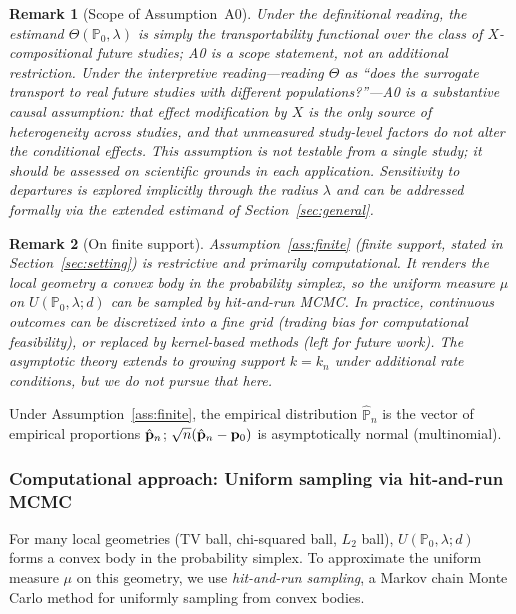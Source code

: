 \documentclass{article}
\newtheorem{remark}{Remark}
\newcommand{\PP}{\mathbb{P}}
\begin{document}
\begin{remark}[Scope of Assumption~A0]
Under the \emph{definitional} reading, the estimand $\Theta(\PP_0,\lambda)$ is
simply the transportability functional over the class of $X$-compositional future
studies; A0 is a scope statement, not an additional restriction.  Under the
\emph{interpretive} reading---reading $\Theta$ as ``does the surrogate transport
to real future studies with different populations?''---A0 is a substantive causal
assumption: that effect modification by $X$ is the only source of heterogeneity
across studies, and that unmeasured study-level factors do not alter the
conditional effects.  This assumption is not testable from a single study; it
should be assessed on scientific grounds in each application. Sensitivity to
departures is explored implicitly through the radius $\lambda$ and can be
addressed formally via the extended estimand of Section~\ref{sec:general}.
\end{remark}

\begin{remark}[On finite support]
Assumption~\ref{ass:finite} (finite support, stated in Section~\ref{sec:setting}) is restrictive
and primarily computational. It renders the local geometry a convex body in the
probability simplex, so the uniform measure $\mu$ on $U(\PP_0, \lambda; d)$ can be
sampled by hit-and-run MCMC. In practice, continuous outcomes can be
discretized into a fine grid (trading bias for computational feasibility), or
replaced by kernel-based methods (left for future work). The asymptotic theory
extends to growing support $k=k_n$ under additional rate conditions, but we do not
pursue that here.
\end{remark}

Under Assumption~\ref{ass:finite}, the empirical distribution $\hat{\PP}_n$ is the vector of empirical proportions $\hat{\mathbf{p}}_n$; $\sqrt{n}(\hat{\mathbf{p}}_n - \mathbf{p}_0)$ is asymptotically normal (multinomial).

\subsubsection{Computational approach: Uniform sampling via hit-and-run MCMC}

For many local geometries (TV ball, chi-squared ball, $L_2$ ball), $U(\PP_0, \lambda; d)$ forms a convex body in the probability simplex. To approximate the uniform measure $\mu$ on this geometry, we use \emph{hit-and-run sampling}, a Markov chain Monte Carlo method for uniformly sampling from convex bodies.
\end{document}

